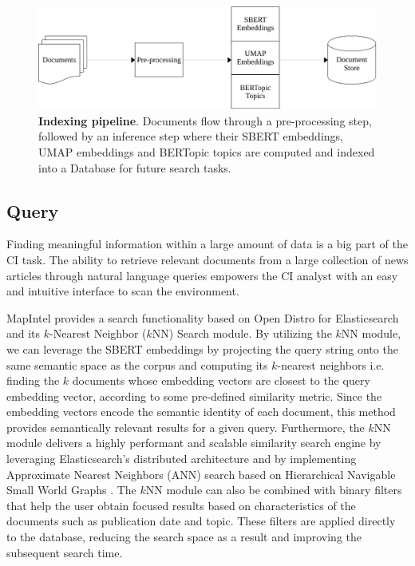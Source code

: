 \documentclass[a4paper]{article}
\begin{document}
\begin{figure}[H]
  \centering
  \includegraphics[scale=0.7]{./assets/indexing_pipeline}
  \caption{\textbf{Indexing pipeline}. Documents flow through a pre-processing step, followed by an inference step where their SBERT embeddings, UMAP embeddings and BERTopic topics are computed and indexed into a Database for future search tasks.}
  \label{indexing_pipeline}
\end{figure}

\subsection{Query} \label{query}
Finding meaningful information within a large amount of data is a big part of the CI task. The ability to retrieve relevant documents from a large collection of news articles through natural language queries empowers the CI analyst with an easy and intuitive interface to scan the environment.

MapIntel provides a search functionality based on Open Distro for Elasticsearch and its $k$-Nearest Neighbor ($k$NN) Search module. By utilizing the $k$NN module, we can leverage the SBERT embeddings by projecting the query string onto the same semantic space as the corpus and computing its $k$-nearest neighbors i.e. finding the $k$ documents whose embedding vectors are closest to the query embedding vector, according to some pre-defined similarity metric. Since the embedding vectors encode the semantic identity of each document, this method provides semantically relevant results for a given query. Furthermore, the $k$NN module delivers a highly performant and scalable similarity search engine by leveraging Elasticsearch’s distributed architecture and by implementing Approximate Nearest Neighbors (ANN) search based on Hierarchical Navigable Small World Graphs \citep{malkov2018}. The $k$NN module can also be combined with binary filters that help the user obtain focused results based on characteristics of the documents such as publication date and topic. These filters are applied directly to the database, reducing the search space as a result and improving the subsequent search time.
\end{document}
